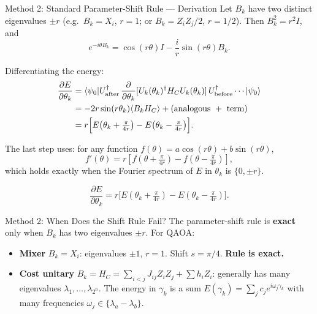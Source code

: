 \documentclass{beamer}
\begin{document}
\begin{frame}

\begin{frame}{Method 2: Standard Parameter-Shift Rule — Derivation}
Let $B_k$ have two distinct eigenvalues $\pm r$ (e.g.\ $B_k = X_i$,
$r=1$; or $B_k = Z_iZ_j/2$, $r=1/2$).  Then $B_k^2 = r^2 I$, and
\[
e^{-i\theta B_k} = \cos(r\theta)I - \frac{i}{r}\sin(r\theta)B_k.
\]

Differentiating the energy:
\begin{align*}
\frac{\partial E}{\partial\theta_k}
&= \langle\psi_0| U_{\rm after}^\dagger\,
   \frac{\partial}{\partial\theta_k}[U_k(\theta_k)^\dagger H_C U_k(\theta_k)]
   \,U_{\rm before}^\dagger \cdots |\psi_0\rangle \\
&= -2r\sin(r\theta_k)\langle B_k H_C\rangle
   + \text{(analogous } + \text{ term)} \\
&= r\Bigl[E\!\left(\theta_k+\tfrac{\pi}{4r}\right)
         - E\!\left(\theta_k-\tfrac{\pi}{4r}\right)\Bigr].
\end{align*}

The last step uses: for any function $f(\theta) = a\cos(r\theta)+b\sin(r\theta)$,
\[
f'(\theta) = r[f(\theta+\tfrac{\pi}{4r}) - f(\theta-\tfrac{\pi}{4r})],
\]
which holds exactly when the Fourier spectrum of $E$ in $\theta_k$ is
$\{0, \pm r\}$.

\[
\boxed{
\frac{\partial E}{\partial\theta_k}
= r\bigl[E(\theta_k+\tfrac{\pi}{4r})
        - E(\theta_k-\tfrac{\pi}{4r})\bigr].
}
\]
\end{frame}


\begin{frame}{Method 2: When Does the Shift Rule Fail?}
The parameter-shift rule is \textbf{exact} only when $B_k$ has two
eigenvalues $\pm r$.  For QAOA:

\begin{itemize}
\item \textbf{Mixer} $B_k = X_i$: eigenvalues $\pm 1$, $r=1$.
  Shift $s = \pi/4$.  \textbf{Rule is exact.}

\item \textbf{Cost unitary} $B_k = H_C = \sum_{i<j}J_{ij}Z_iZ_j+\sum h_iZ_i$:
  generally has many eigenvalues $\lambda_1,\dots,\lambda_{2^n}$.
  The energy in $\gamma_k$ is a sum
  $E(\gamma_k) = \sum_j c_j e^{i\omega_j\gamma_k}$ with
  many frequencies $\omega_j \in \{\lambda_a - \lambda_b\}$.
\end{itemize}


\end{frame}
\end{frame}
\end{document}

